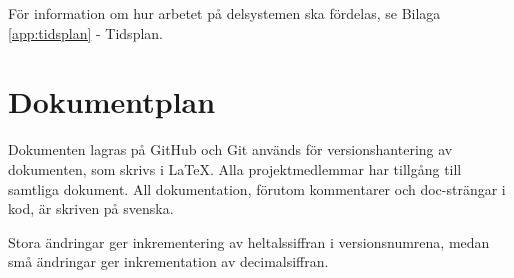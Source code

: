 \documentclass[a4paper,titlepage,12pt]{article}
\begin{document}
    För information om hur arbetet på delsystemen ska fördelas, se Bilaga
    \ref{app:tidsplan} - Tidsplan.
	
	\section{Dokumentplan}
    Dokumenten lagras på GitHub och Git används för versionshantering av
    dokumenten, som skrivs i LaTeX. Alla projektmedlemmar har tillgång till
    samtliga dokument. All dokumentation, förutom kommentarer och doc-strängar
    i kod, är skriven på svenska.

    Stora ändringar ger inkrementering av heltalssiffran i versionsnumrena,
    medan små ändringar ger inkrementation av decimalsiffran.
	
\end{document}
